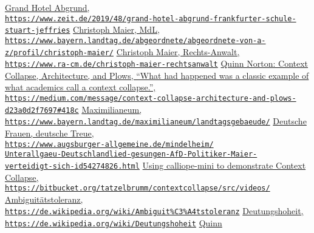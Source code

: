 \documentclass[a4,parindent=0pt]{article}
\begin{document}
\begin{thebibliography}{88}
  \href{https://www.zeit.de/2019/48/grand-hotel-abgrund-frankfurter-schule-stuart-jeffries}{Grand
  Hotel Abgrund,\\
\texttt{https://www.zeit.de/2019/48/grand-hotel-abgrund-frankfurter-schule-stuart-jeffries}}
  \href{https://www.bayern.landtag.de/abgeordnete/abgeordnete-von-a-z/profil/christoph-maier/}{Christoph
  Maier, MdL,\\
\texttt{https://www.bayern.landtag.de/abgeordnete/abgeordnete-von-a-z/profil/christoph-maier/}}
  \href{https://www.ra-cm.de/christoph-maier-rechtsanwalt}{Christoph
  Maier, Rechts-Anwalt,\\
\texttt{https://www.ra-cm.de/christoph-maier-rechtsanwalt}}
  \href{https://medium.com/message/context-collapse-architecture-and-plows-d23a0d2f7697#418c}{Quinn Norton: Context Collapse, Architecture, and Plows, 
``What had happened was a classic example of what academics call a context collapse.'',\\
\texttt{https://medium.com/message/context-collapse-architecture-and-plows-d23a0d2f7697\#418c}}
  \href{https://www.bayern.landtag.de/maximilianeum/landtagsgebaeude/}{Maximilianeum,\\
\texttt{https://www.bayern.landtag.de/maximilianeum/landtagsgebaeude/}}
  \href{https://www.augsburger-allgemeine.de/mindelheim/Unterallgaeu-Deutschlandlied-gesungen-AfD-Politiker-Maier-verteidigt-sich-id54274826.html}{Deutsche
  Frauen, deutsche Treue,\\
\texttt{https://www.augsburger-allgemeine.de/mindelheim/\\Unterallgaeu-Deutschlandlied-gesungen-AfD-Politiker-Maier-\\verteidigt-sich-id54274826.html}}
  \href{https://bitbucket.org/tatzelbrumm/contextcollapse/src/videos/}{Using
  calliope-mini to demonstrate Context Collapse,\\
\texttt{https://bitbucket.org/tatzelbrumm/contextcollapse/src/videos/}}
  \href{https://de.wikipedia.org/wiki/Ambiguit\%C3\%A4tstoleranz}{Ambiguitätstoleranz,\\
\texttt{https://de.wikipedia.org/wiki/Ambiguit\%C3\%A4tstoleranz}}
  \href{https://de.wikipedia.org/wiki/Deutungshoheit}{Deutungshoheit,\\
\texttt{https://de.wikipedia.org/wiki/Deutungshoheit}}
  \href{https://www.theatlantic.com/technology/archive/2018/02/the-new-york-times-fired-my-doppelganger/554402/}{Quinn
}
\end{thebibliography}
\end{document}

